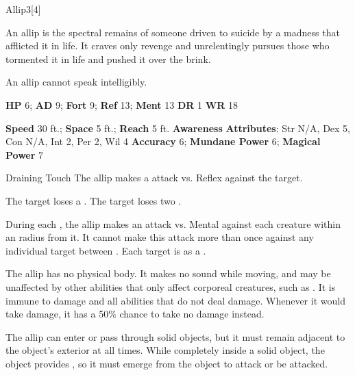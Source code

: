   \begin{monsection}{Allip}{3}[4]
    \vspace{-1em}\vspace{-1em}
    \vspace{0em}

    
      An allip is the spectral remains of someone driven to suicide by a madness that afflicted it in life.
      It craves only revenge and unrelentingly pursues those who tormented it in life and pushed it over the brink.

      An allip cannot speak intelligibly.
    

    \begin{spellcontent}
      \begin{spelltargetinginfo}
        \pari \textbf{HP} 6;
          \textbf{AD} 9;
          \textbf{Fort} 9;
          \textbf{Ref} 13;
          \textbf{Ment} 13
        \pari \textbf{DR} 1
        \pari \textbf{WR} 18
        
      \end{spelltargetinginfo}
    \end{spellcontent}
    \begin{monsterfooter}
      \pari \textbf{Speed} 30 ft.;
        \textbf{Space} 5 ft.;
        \textbf{Reach} 5 ft.
      \pari \textbf{Awareness} 
      \pari \textbf{Attributes}:
        Str N/A, Dex 5,
        Con N/A, Int 2,
        Per 2, Wil 4
      \pari \textbf{Accuracy} 6;
        \textbf{Mundane Power} 6;
      \textbf{Magical Power} 7
    \end{monsterfooter}
  \end{monsection}
  \begin{freeability}{Draining Touch}
      The allip makes a  attack
        vs. Reflex against the target.
    
    \hit The target loses a .
    \crit The target loses two .
    \end{freeability}
  
          During each , the allip makes an attack vs. Mental against each creature
          within an \arealarge radius  from it.
          It cannot make this attack more than once against any individual target between .
          \hit Each target is  as a .
        
      The allip has no physical body.
      It makes no sound while moving, and may be unaffected by other abilities that only affect corporeal creatures, such as .
      It is immune to  damage and all  abilities that do not deal damage.
      Whenever it would take damage, it has a 50\% chance to take no damage instead.

      The allip can enter or pass through solid objects, but it must remain adjacent to the object's exterior at all times.
      While completely inside a solid object, the object provides , so it must emerge from the object to attack or be attacked.
  
